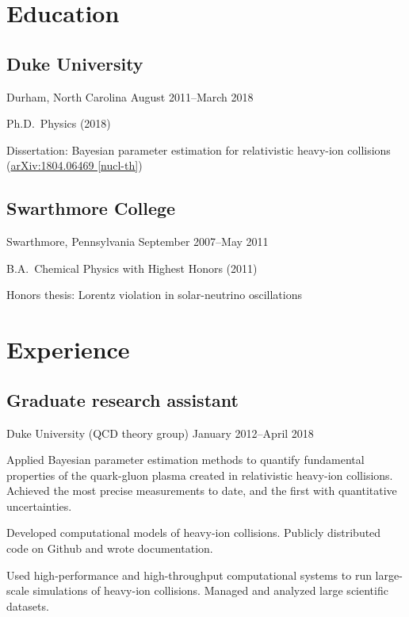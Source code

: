 \documentclass[letterpaper,10pt]{article}
\begin{document}
\begin{multicols}{2}

\section{Education}

\subsection{Duke University}
\vspace{-\parskip}
{\small Durham, North Carolina \hfill August 2011--March 2018}

Ph.D.\ Physics (2018)

Dissertation: Bayesian parameter estimation for relativistic heavy-ion collisions
(\href{https://arxiv.org/abs/1804.06469}{arXiv:1804.06469 [nucl-th]})

\subsection{Swarthmore College}
\vspace{-\parskip}
{\small Swarthmore, Pennsylvania \hfill September 2007--May 2011}

B.A.\ Chemical Physics with Highest Honors (2011)

Honors thesis: Lorentz violation in solar-neutrino oscillations


\section{Experience}

\subsection{Graduate research assistant}
\vspace{-\parskip}
{\small Duke University (QCD theory group) \hfill January 2012--April 2018}

Applied Bayesian parameter estimation methods to quantify fundamental properties of the quark-gluon plasma created in relativistic heavy-ion collisions.
Achieved the most precise measurements to date, and the first with quantitative uncertainties.

Developed computational models of heavy-ion collisions.
Publicly distributed code on Github and wrote documentation.

Used high-performance and high-throughput computational systems to run large-scale simulations of heavy-ion collisions.
Managed and analyzed large scientific datasets.


\end{multicols}
\end{document}
